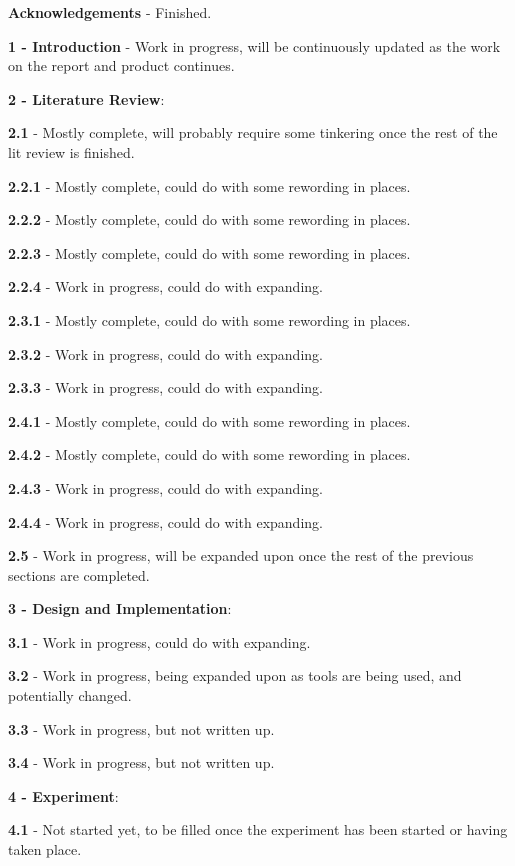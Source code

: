 \documentclass[abstract=on,12pt]{scrreprt}
\begin{document}
	
			\textbf{Acknowledgements} - Finished.
			
	
			\textbf{1 - Introduction} - Work in progress, will be continuously updated as the work on the report and product continues.
			
	
			\textbf{2 - Literature Review}:
			
			\textbf{2.1} - Mostly complete, will probably require some tinkering once the rest of the lit review is finished.
			
			\textbf{2.2.1} - Mostly complete, could do with some rewording in places.
			
			\textbf{2.2.2} - Mostly complete, could do with some rewording in places.
			
			\textbf{2.2.3} - Mostly complete, could do with some rewording in places.
			
			\textbf{2.2.4} - Work in progress, could do with expanding.
			
			\textbf{2.3.1} - Mostly complete, could do with some rewording in places.
			
			\textbf{2.3.2} - Work in progress, could do with expanding.
			
			\textbf{2.3.3} - Work in progress, could do with expanding.
			
			\textbf{2.4.1} - Mostly complete, could do with some rewording in places.
			
			\textbf{2.4.2} - Mostly complete, could do with some rewording in places.
			
			\textbf{2.4.3} - Work in progress, could do with expanding.
			
			\textbf{2.4.4} - Work in progress, could do with expanding.
			
			\textbf{2.5} - Work in progress, will be expanded upon once the rest of the previous sections are completed.
			
	
			\textbf{3 - Design and Implementation}:
			
			\textbf{3.1} - Work in progress, could do with expanding.
			
			\textbf{3.2} - Work in progress, being expanded upon as tools are being used, and potentially changed.
			
			\textbf{3.3} - Work in progress, but not written up.
			
			\textbf{3.4} - Work in progress, but not written up.
			
	
			\textbf{4 - Experiment}:
			
			\textbf{4.1} - Not started yet, to be filled once the experiment has been started or having taken place.
			
\end{document}
